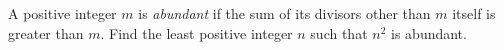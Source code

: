 A positive integer $m$ is \emph{abundant} if the sum of its divisors other than $m$ itself is greater than $m$. Find the least positive integer $n$ such that $n^2$ is abundant.

